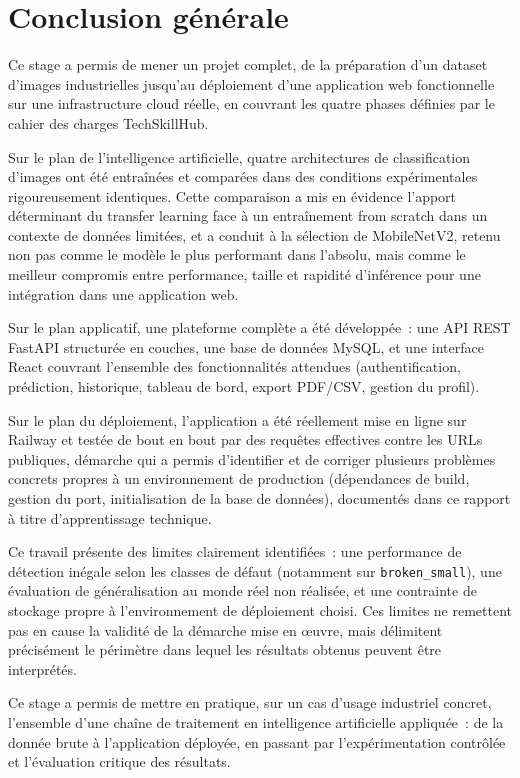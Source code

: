 \chapter{Conclusion g\'en\'erale}
\label{ch:conclusion}

Ce stage a permis de mener un projet complet, de la pr\'eparation d'un dataset d'images industrielles jusqu'au d\'eploiement d'une application web fonctionnelle sur une infrastructure cloud r\'eelle, en couvrant les quatre phases d\'efinies par le cahier des charges TechSkillHub.

Sur le plan de l'intelligence artificielle, quatre architectures de classification d'images ont \'et\'e entra\^in\'ees et compar\'ees dans des conditions exp\'erimentales rigoureusement identiques. Cette comparaison a mis en \'evidence l'apport d\'eterminant du transfer learning face \`a un entra\^inement from scratch dans un contexte de donn\'ees limit\'ees, et a conduit \`a la s\'election de MobileNetV2, retenu non pas comme le mod\`ele le plus performant dans l'absolu, mais comme le meilleur compromis entre performance, taille et rapidit\'e d'inf\'erence pour une int\'egration dans une application web.

Sur le plan applicatif, une plateforme compl\`ete a \'et\'e d\'evelopp\'ee~: une API REST FastAPI structur\'ee en couches, une base de donn\'ees MySQL, et une interface React couvrant l'ensemble des fonctionnalit\'es attendues (authentification, pr\'ediction, historique, tableau de bord, export PDF/CSV, gestion du profil).

Sur le plan du d\'eploiement, l'application a \'et\'e r\'eellement mise en ligne sur Railway et test\'ee de bout en bout par des requ\^etes effectives contre les URLs publiques, d\'emarche qui a permis d'identifier et de corriger plusieurs probl\`emes concrets propres \`a un environnement de production (d\'ependances de build, gestion du port, initialisation de la base de donn\'ees), document\'es dans ce rapport \`a titre d'apprentissage technique.

Ce travail pr\'esente des limites clairement identifi\'ees~: une performance de d\'etection in\'egale selon les classes de d\'efaut (notamment sur \texttt{broken\_small}), une \'evaluation de g\'en\'eralisation au monde r\'eel non r\'ealis\'ee, et une contrainte de stockage propre \`a l'environnement de d\'eploiement choisi. Ces limites ne remettent pas en cause la validit\'e de la d\'emarche mise en \oe uvre, mais d\'elimitent pr\'ecis\'ement le p\'erim\`etre dans lequel les r\'esultats obtenus peuvent \^etre interpr\'et\'es.

Ce stage a permis de mettre en pratique, sur un cas d'usage industriel concret, l'ensemble d'une cha\^ine de traitement en intelligence artificielle appliqu\'ee~: de la donn\'ee brute \`a l'application d\'eploy\'ee, en passant par l'exp\'erimentation contr\^ol\'ee et l'\'evaluation critique des r\'esultats.

